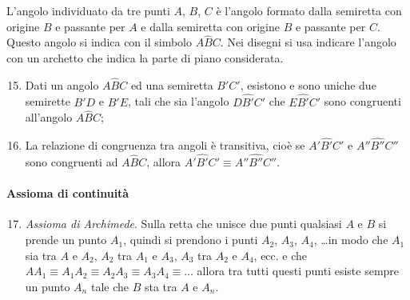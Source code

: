 L'angolo individuato da tre punti \(A\), \(B\), \(C\) è l'angolo formato 
dalla semiretta con origine \(B\) e passante per \(A\) e dalla semiretta 
con origine \(B\) e passante per \(C\). Questo angolo si indica con il 
simbolo \(A\widehat{B}C\). Nei disegni si usa indicare l'angolo con un 
archetto che indica la parte di piano considerata.

\begin{enumerate}[label=\Roman{*}.]
\setcounter{enumi}{14}
\item Dati un angolo \(A\widehat{B}C\) ed una semiretta \(B'C'\), 
esistono e sono uniche due semirette \(B'D\) e \(B'E\), tali che sia 
l'angolo \(D\widehat{B'}C'\) che \(E\widehat{B'}C'\) sono congruenti 
all'angolo \(A\widehat{B}C\);%

\begin{inaccessibleblock}
 \begin{center} \end{center}
\end{inaccessibleblock}
\item La relazione di congruenza tra angoli è transitiva, cioè se  
\(A'\widehat{B'}C'\) e  \(A''\widehat{B''}C''\) sono congruenti ad 
\(A\widehat{B}C\), allora  \(A'\widehat{B'}C' \equiv 
A''\widehat{B''}C''\).
\end{enumerate}

\paragraph{Assioma di continuità}

\begin{enumerate}[label=\Roman{*}., nosep]
\setcounter{enumi}{16}
\item \emph{Assioma di Archimede}. Sulla retta che unisce due punti 
qualsiasi \(A\) e \(B\) si prende un punto \(A_1\), quindi si prendono i 
punti \(A_2\), \(A_3\), \(A_4\), \ldots in modo che \(A_1\) sia tra \(A\) e 
\(A_2\), \(A_2\) tra \(A_1\) e \(A_3\), \(A_3\) tra \(A_2\) e \(A_4\), ecc. e che  
\(AA_1\equiv A_1A_2\equiv A_2A_3\equiv A_3A_4\equiv\ldots\) allora tra 
tutti questi punti esiste sempre un punto \(A_n\) tale che \(B\) sta tra 
\(A\) e \(A_n\).%

\begin{inaccessibleblock}
 \begin{center} \end{center}
\end{inaccessibleblock}
\end{enumerate}

